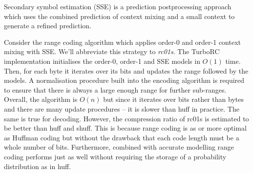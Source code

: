 Secondary symbol estimation (SSE) is a prediction postprocessing approach which
uses the combined prediction of context mixing and a small context to generate a
refined prediction.

Consider the range coding algorithm which applies order-0 and order-1
context mixing with SSE. We'll abbreviate this strategy to \textit{rc01s}. The
TurboRC implementation initialises the order-0, order-1 and SSE models in $O(1)$
time. Then, for each byte it iterates over its bits and updates the range
followed by the models. A normalisation procedure built into the encoding
algorithm is required to ensure that there is always a large enough range for
further sub-ranges. Overall, the algorithm is $O(n)$ but since it iterates over
bits rather than bytes and there are many update procedures -- it is slower than
huff in practice. The same is true for decoding. However, the compression ratio
of rc01s is estimated to be better than huff and shuff. This is because range
coding is as or more optimal as Huffman coding but without the drawback that
each code length must be a whole number of bits. Furthermore, combined with
accurate modelling range coding performs just as well without requiring the
storage of a probability distribution as in huff.

